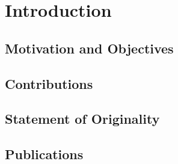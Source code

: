 \chapter{Introduction}

\section{Motivation and Objectives}

\blindtext[5]



\section{Contributions}

\blindtext[8]


\section{Statement of Originality}

\blindtext[2]


\section{Publications}
\blindtext[5]
